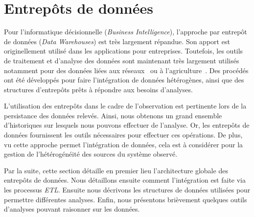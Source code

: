 \section{Entrepôts de données}\label{sec:rw:supervision:warehouse}
Pour l'informatique décisionnelle (\textit{Business Intelligence}), l'approche par entrepôt de données (\textit{Data Warehouses}) est très largement répandue. Son apport est originellement utilisé dans les applications pour entreprises. Toutefois, les outils de traitement et d'analyse des données sont maintenant très largement utilisés notamment pour des données liées aux réseaux~\cite{Gilbert:quicksand} ou à l'agriculture~\cite{Abdullah:olap}. Des procédés ont été développés pour faire l'intégration de données hétérogènes, ainsi que des structures d'entrepôts prêts à répondre aux besoins d'analyses.

L'utilisation des entrepôts dans le cadre de l'observation est pertinente lors de la persistance des données relevés. Ainsi, nous obtenons un grand ensemble d'historiques sur lesquels nous pouvons effectuer de l'analyse. Or, les entrepôts de données fournissent les outils nécessaires pour effectuer ces opérations. De plus, vu cette approche permet l'intégration de données, cela est à considérer pour la gestion de l'hétérogénéité des sources du système observé.

Par la suite, cette section détaille en premier lieu l'architecture globale des entrepôts de données. Nous détaillons ensuite comment l'intégration est faite via les processus \textit{ETL}. Ensuite nous décrivons les structures de données utilisées pour permettre différentes analyses. Enfin, nous présentons brièvement quelques outils d'analyses pouvant raisonner sur les données.

